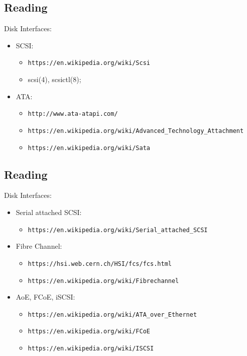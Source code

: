 \documentclass[xga]{xdvislides}
\begin{document}
\subsection{Reading}
Disk Interfaces:
\begin{itemize}
	\item SCSI:
		\begin{itemize}
			\item \verb+https://en.wikipedia.org/wiki/Scsi+
			\item scsi(4), scsictl(8);
		\end{itemize}
	\item ATA:
		\begin{itemize}
			\item \verb+http://www.ata-atapi.com/+
			\item \verb+https://en.wikipedia.org/wiki/Advanced_Technology_Attachment+
			\item \verb+https://en.wikipedia.org/wiki/Sata+
		\end{itemize}
\end{itemize}

\subsection{Reading}
Disk Interfaces:
\begin{itemize}
	\item Serial attached SCSI:
		\begin{itemize}
			\item \verb+https://en.wikipedia.org/wiki/Serial_attached_SCSI+
		\end{itemize}
	\item Fibre Channel:
		\begin{itemize}
			\item \verb+https://hsi.web.cern.ch/HSI/fcs/fcs.html+
			\item \verb+https://en.wikipedia.org/wiki/Fibrechannel+
		\end{itemize}
	\item AoE, FCoE, iSCSI:
		\begin{itemize}
			\item \verb+https://en.wikipedia.org/wiki/ATA_over_Ethernet+
			\item \verb+https://en.wikipedia.org/wiki/FCoE+
			\item \verb+https://en.wikipedia.org/wiki/ISCSI+
		\end{itemize}
\end{itemize}
\end{document}
